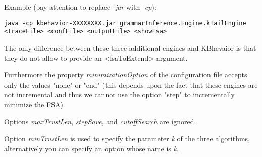 Example (pay attention to replace \emph{-jar} with \emph{-cp}):

\texttt{java -cp kbehavior-XXXXXXXX.jar grammarInference.Engine.kTailEngine <traceFile> <confFile>
<outputFile> <showFsa>}

The only difference between these three additional engines and KBhevaior is that they do not allow to provide an <fsaToExtend> argument.

Furthermore the property \emph{minimizationOption} of the configuration file accepts only the values "none" or "end" (this depends upon the fact that these engines are not incremental and thus we cannot use the option "step" to incrementally minimize the FSA).

Options \emph{maxTrustLen}, \emph{stepSave}, and \emph{cutoffSearch} are ignored.

Option \emph{minTrustLen} is used to specify the parameter \emph{k} of the three algorithms, alternatively you can specify an option whose name is \emph{k}.


